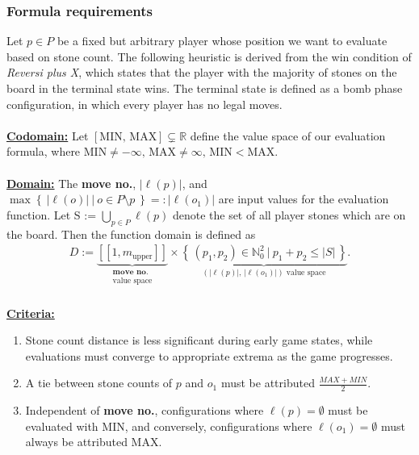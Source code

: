 \documentclass[article,fleqn,12pt]{article}
\begin{document}
\subsubsection{Formula requirements}
Let \(p \in P\) be a fixed but arbitrary player whose position we want to evaluate based on stone count. The following heuristic is derived from the win condition of \textit{Reversi plus X}, which states that the player with the majority of stones on the board in the terminal state wins. The terminal state is defined as a bomb phase configuration, in which every player has no legal moves. \\\\
\underline{\textbf{Codomain:}} Let \(\left[\text{MIN},\,\text{MAX}\right] \subsetneq \mathbb{R}\) define the value space of our evaluation formula, where \(\text{MIN} \neq -\infty,\,\text{MAX} \neq \infty,\,\text{MIN} < \text{MAX}\). \\\\
\underline{\textbf{Domain:}} The \textbf{move no.}, \(\left|\ell(p)\right|\), and \(\max\left\{\ \left|\ell(o)\right|\ |\ o \in P \setminus p\ \right\} =: \left|\ell(o_1)\right|\) are input values for the evaluation function. Let S := \(\bigcup_{p\in P}\ell(p)\) denote the set of all player stones which are on the board. Then the function domain is defined as
\begin{align*} 
D := \underbrace{\left[\!\left[1, m_{\text{upper}}\right]\!\right]}_{\substack{\textbf{move no.}\\\text{value space}}} \times \underbrace{\left\{\, \left(p_1, p_2\right) \in \mathbb{N}_0^{2}\ |\ p_1 + p_2 \leq \left|S\right|\, \right\}}_{\left(\left|\ell(p)\right|,\,\left|\ell(o_1)\right|\right) \text{ value space}}.
\end{align*} \\
\underline{\textbf{Criteria:}}
\begin{enumerate}[label=(\roman*)]
\item Stone count distance is less significant during early game states, while evaluations must converge to appropriate extrema as the game progresses. 
\item A tie between stone counts of \(p\) and \(o_1\) must be attributed \(\frac{MAX + MIN}{2}\).
\item Independent of \textbf{move no.}, configurations where \(\ell(p) = \emptyset\) must be evaluated with MIN, and conversely, configurations where \(\ell(o_1) = \emptyset\) must always be attributed MAX. 
\end{enumerate}
\end{document}
